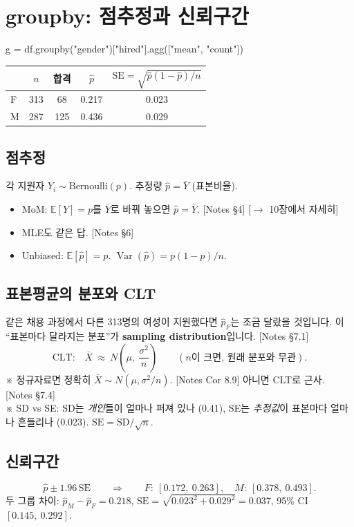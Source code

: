 \documentclass[11pt,a4paper]{article}
\newcommand{\E}{\mathbb{E}}
\newcommand{\Var}{\operatorname{Var}}
\newcommand{\SD}{\mathrm{SD}}
\newcommand{\SE}{\mathrm{SE}}
\newcommand{\term}[1]{\textbf{#1}}
\newcommand{\nref}[1]{{\footnotesize\textsf{\color{blue!55!black}[Notes #1]}}}
\newcommand{\aside}[1]{{\footnotesize\color{black!65}#1}}
\newcommand{\fwd}[1]{{\footnotesize\textsf{\color{green!40!black}[$\to$ #1에서 자세히]}}}
\begin{document}
\section{groupby: 점추정과 신뢰구간}

\begin{codebox}
g = df.groupby("gender")["hired"].agg(["mean", "count"])
\end{codebox}
\begin{center}
\begin{tabular}{@{}l c c c c@{}}
\toprule
 & $n$ & 합격 & $\hat p$ & $\SE=\sqrt{\hat p(1-\hat p)/n}$ \\
\midrule
F & 313 & 68 & 0.217 & 0.023 \\
M & 287 & 125 & 0.436 & 0.029 \\
\bottomrule
\end{tabular}
\end{center}

\subsection{점추정}
각 지원자 $Y_i\sim\text{Bernoulli}(p)$. 추정량 $\hat p=\bar Y$ (표본비율).
\begin{itemize}
\item MoM: $\E[Y]=p$를 $\bar Y$로 바꿔 놓으면 $\hat p=\bar Y$. \nref{§4} \fwd{10장}
\item MLE도 같은 답. \nref{§6}
\item Unbiased: $\E[\hat p]=p$. $\Var(\hat p)=p(1-p)/n$.
\end{itemize}

\subsection{표본평균의 분포와 CLT}
같은 채용 과정에서 다른 313명의 여성이 지원했다면 $\hat p_F$는 조금 달랐을 것입니다. 이 ``표본마다 달라지는 분포''가 \term{sampling distribution}입니다. \nref{§7.1}
\[
\text{CLT:}\quad \bar X\ \approx\ N\!\left(\mu,\ \frac{\sigma^2}{n}\right)\qquad(n\text{이 크면, 원래 분포와 무관}).
\]
\aside{※ 정규자료면 정확히 $\bar X\sim N(\mu,\sigma^2/n)$. \nref{Cor 8.9} 아니면 CLT로 근사. \nref{§7.4}}\\
\aside{※ SD vs SE: SD는 \emph{개인}들이 얼마나 퍼져 있나 (0.41), SE는 \emph{추정값}이 표본마다 얼마나 흔들리나 (0.023). $\SE=\SD/\sqrt n$.}

\subsection{신뢰구간}
\[
\hat p\pm1.96\,\SE \qquad\Longrightarrow\qquad F:\ [0.172,\ 0.263],\quad M:\ [0.378,\ 0.493].
\]
두 그룹 차이: $\hat p_M-\hat p_F=0.218$, $\SE=\sqrt{0.023^2+0.029^2}=0.037$, 95\% CI $[0.145,\ 0.292]$.
\end{document}
